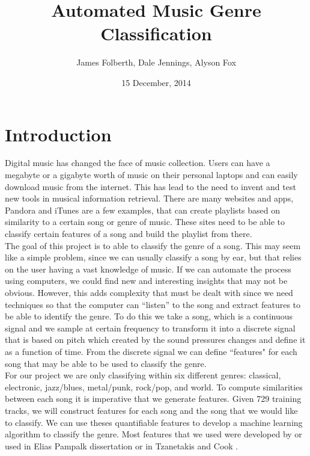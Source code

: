 \documentclass[12pt]{article}
\begin{document}
\title{Automated Music Genre Classification}
\author{James Folberth, Dale Jennings, Alyson Fox}
\date{15 December, 2014}
\maketitle
\section{Introduction}
\indent Digital music has changed the face of music collection. Users can have a megabyte or a gigabyte worth of music on their personal laptops and can easily download music from the internet. This has lead to the need to invent and test new tools in musical information retrieval. There are many websites and apps, Pandora and iTunes are a few examples, that can create playlists based on similarity to a certain song or genre of music. These sites need to be able to classify certain features of a song and build the playlist from there.\\

The goal of this project is to able to classify the genre of a song. This may seem like a simple problem, since we can usually classify a song by ear, but that relies on the user having a vast knowledge of music. If we can automate the process using computers, we could find new and interesting insights that may not be obvious. However, this adds complexity that must be dealt with since we need techniques so that  the computer can ``listen'' to the song and extract features to be able to identify the genre. To do this we take  a song, which is a continuous signal and we sample at certain frequency to transform it into a discrete signal that is based on pitch which created by the sound pressures changes  and define it as a function of time. From the discrete signal we can define  ``features" for each song that may be able to be used to classify the genre.\\

 For our project we are only classifying within six different genres: classical, electronic, jazz/blues, metal/punk, rock/pop, and world. To compute similarities between each song it is imperative that we generate features. Given 729 training tracks, we will construct features for each song and the song that we would like to classify. We can use theses quantifiable features to develop a machine learning algorithm to classify the genre. Most features that we used were developed by or used in Elias Pampalk dissertation \cite{pampalk:dissertation} or in Tzanetakis and Cook \cite{tzanetakis:classification}.
\end{document}
